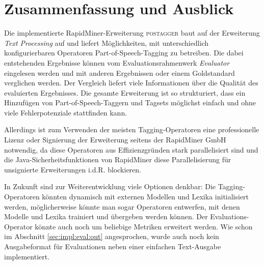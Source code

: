 %
\chapter{Zusammenfassung und Ausblick}
\label{sec:conclusion}

Die implementierte RapidMiner-Erweiterung \textsc{postagger} baut auf der Erweiterung \textit{Text Processing} auf und liefert Möglichkeiten, mit unterschiedlich konfigurierbaren Operatoren Part-of-Speech-Tagging zu betreiben. Die dabei entstehenden Ergebnisse können vom Evaluationsrahmenwerk \textit{Evaluator} eingelesen werden und mit anderen Ergebnissen oder einem Goldstandard verglichen werden. Der Vergleich liefert viele Informationen über die Qualität des evaluierten Ergebnisses. Die gesamte Erweiterung ist so strukturiert, dass ein Hinzufügen von Part-of-Speech-Taggern und Tagsets möglichst einfach und ohne viele Fehlerpotenziale stattfinden kann.

Allerdings ist zum Verwenden der meisten Tagging-Operatoren eine professionelle Lizenz oder Signierung der Erweiterung seitens der RapidMiner GmbH notwendig, da diese Operatoren aus Effizienzgründen stark parallelisiert sind und die Java-Sicherheitsfunktionen von RapidMiner diese Parallelisierung für unsignierte Erweiterungen i.d.R. blockieren.

In Zukunft sind zur Weiterentwicklung viele Optionen denkbar: Die Tagging-Operatoren könnten dynamisch mit externen Modellen und Lexika initialisiert werden, möglicherweise könnte man sogar Operatoren entwerfen, mit denen Modelle und Lexika trainiert und übergeben werden können. Der Evaluations-Operator könnte auch noch um beliebige Metriken erweitert werden. Wie schon im Abschnitt \ref{sec:impl:eval:out} angesprochen, wurde auch noch kein Ausgabeformat für Evaluationen neben einer einfachen Text-Ausgabe implementiert.

